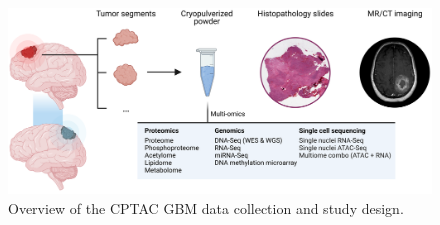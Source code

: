 \begin{figure}[tb]
    \centering
    \includegraphics[width=1\linewidth]{figures/chap01_intro/cptac_gbm_multi-omics.png}
    \caption[Overview of the CPTAC GBM data collection and study design.]{%
        Overview of the CPTAC GBM data collection and study design.
    }
    \label{fig:intro-cptac-gbm-study design}
\end{figure}


